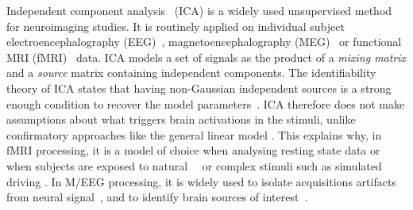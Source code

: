 Independent component analysis~\cite{hyvarinen2000independent} (ICA) is a widely used unsupervised method for neuroimaging studies. It is routinely applied on individual subject electroencephalography (EEG)~\cite{makeig1996independent}, magnetoencephalography (MEG)~\cite{vigario1998independent} or functional MRI (fMRI)~\cite{mckeown1998independent} data. 
%
ICA models a set of signals as the product of a \emph{mixing matrix} and a \emph{source} matrix containing independent components.
%
The identifiability theory of ICA states that having non-Gaussian independent sources is a strong enough condition to recover the model parameters~\cite{comon1994independent}.
%
ICA therefore does not make assumptions about what triggers brain activations in the stimuli, unlike confirmatory approaches like the general linear model \cite{friston1994statistical, poline2012general}.
%
This explains why, in fMRI processing, it is a model of choice when analysing
resting state data \cite{beckmann2005investigations} or when subjects are
exposed to natural~\cite{malinen2007towards}~\cite{bartels2005brain} or complex stimuli such as simulated driving \cite{calhoun2002different}.
In M/EEG processing, it is widely used to isolate acquisitions artifacts from neural signal~\cite{jung1998extended}, and to identify brain sources of interest~\cite{vigario2000independent, delorme2012independent}.

